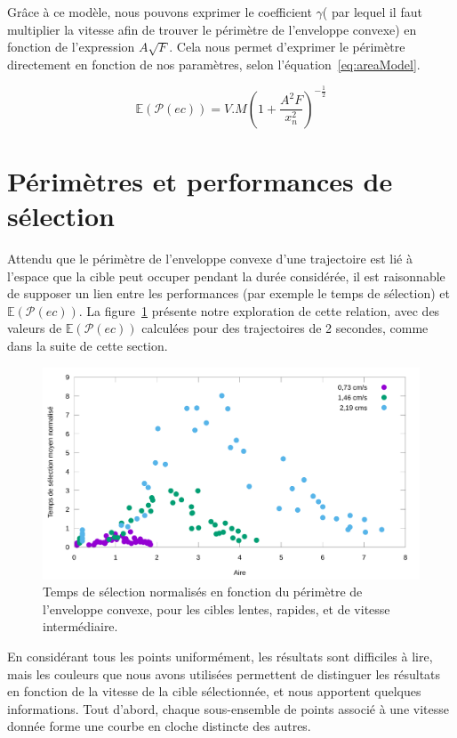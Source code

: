 	Grâce à ce modèle, nous pouvons exprimer le coefficient $\gamma$( par lequel il faut multiplier la vitesse afin de trouver le périmètre de l'enveloppe convexe) en fonction de l'expression $A\sqrt{F}$. Cela nous permet d'exprimer le périmètre directement en fonction de nos paramètres, selon l'équation~\ref{eq:areaModel}.
	
	\begin{equation}
		\mathbb{E}(\mathcal{P}(ec)) = V.M \left( 1 + \frac{A^{2}F}{x_{n}^{2}}\right)^{-\frac{1}{2}}
		\label{eq:perimModel}
	\end{equation}
	
	
\section{Périmètres et performances de sélection}
	Attendu que le périmètre de l'enveloppe convexe d'une trajectoire est lié à l'espace que la cible peut occuper pendant la durée considérée, il est raisonnable de supposer un lien entre les performances (par exemple le temps de sélection) et $\mathbb{E}(\mathcal{P}(ec))$. La figure~\ref{fig:perfVareaRaw} présente notre exploration de cette relation, avec des valeurs de $\mathbb{E}(\mathcal{P}(ec))$ calculées pour des trajectoires de 2 secondes, comme dans la suite de cette section.

	\begin{figure}[!htb]
		\centering
		\includegraphics[width=\textwidth]{figures/ch4/perfVareaRaw}
		\caption[Temps de sélection en fonction du périmètre de l'enveloppe convexe]{Temps de sélection normalisés en fonction du périmètre de l'enveloppe convexe, pour les cibles lentes, rapides, et de vitesse intermédiaire.}
		\label{fig:perfVareaRaw}
	\end{figure}

	En considérant tous les points uniformément, les résultats sont difficiles à lire, mais les couleurs que nous avons utilisées permettent de distinguer les résultats en fonction de la vitesse de la cible sélectionnée, et nous apportent quelques informations. Tout d'abord, chaque sous-ensemble de points associé à une vitesse donnée forme une courbe \og en cloche \fg{} distincte des autres.
	
